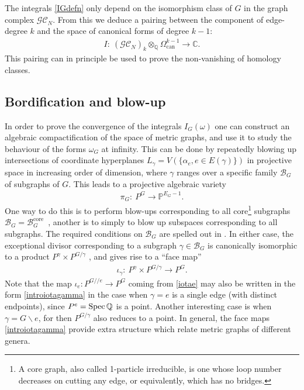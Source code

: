 \documentclass[pdftex]{sigma}%
\numberwithin{equation}{section}
\newcommand{\To}{\longrightarrow}
\newcommand{\Q}{\mathbb Q}
\newcommand{\C}{\mathbb C}
\newcommand{\Pro}{\mathbb P}
\newcommand{\GC}{\mathcal{GC}}
\newcommand{\q}{/\!/}
\newcommand{\can}{\mathrm{can}}
\newcommand{\0}{\color{blue}{\mathsf{0}}}
\begin{document}
The integrals \eqref{IGdefn} only depend on the isomorphism class of $G$ in the graph complex $\GC_N$. From this we deduce a pairing between the component of edge-degree $k$ and the space of canonical forms of degree $k-1$:
\begin{gather*} %
I \colon\ (\GC_N)_{k} \otimes_{\Q} \Omega^{k-1}_{\can} \To \C.
\end{gather*}
 This pairing can in principle be used to prove the non-vanishing of homology classes.

 \subsection{Bordification and blow-up} \label{sect: algdiffblowup} In order to prove the convergence of the integrals $I_G(\omega)$
 one can construct an algebraic compactification of the space of metric graphs, and use it to study the behaviour of the forms $\omega_G$ at infinity.
 This can be done by repeatedly blowing up intersections of coordinate hyperplanes $L_{\gamma}= V(\{\alpha_e, e \in E(\gamma)\})$ in projective space in increasing order of dimension, where $\gamma$ ranges over a specific family $\mathcal{B}_G$ of subgraphs of $G$. This leads to a projective algebraic variety
 \begin{gather} \label{PGblowup}
 \pi_G\colon\ P^G \To \Pro^{E_G-1}.
 \end{gather}
 One way to do this is to perform blow-ups corresponding to all core\footnote{A core graph, also called 1-particle irreducible, is one whose loop number decreases on cutting any edge, or equivalently, which has no bridges.} subgraphs $\mathcal{B}_G= \mathcal{B}^{\mathrm{core}}_G$~\cite{BEK}, another is to simply to blow up subspaces corresponding to all subgraphs. The required conditions on $\mathcal{B}_G$ are spelled out in \cite[Section~5.1]{Cosmic}. In either case,
 the exceptional divisor corresponding to a subgraph $\gamma \in \mathcal{B}_G$ is canonically isomorphic to a product $P^{\gamma}\times P^{G/\gamma}$ , and gives rise to a ``face map'' \begin{gather} \label{introiotagamma}
 \iota_{\gamma}\colon \ P^{\gamma} \times P^{G/\gamma} \To P^G.
 \end{gather}
 Note that the map $\iota_e\colon P^{G\q e} \rightarrow P^{G}$ coming from \eqref{iotae} may also be written in the form \eqref{introiotagamma} in the case when $\gamma =e$ is a single edge (with distinct endpoints), since $P^e= \mathop{\rm Spec} \Q $ is a point. Another interesting case is when $\gamma = G\backslash e$, for then $P^{G/\gamma}$ also reduces to a point.
 In general, the face maps \eqref{introiotagamma} provide extra structure which relate metric graphs of different genera.
\end{document}
